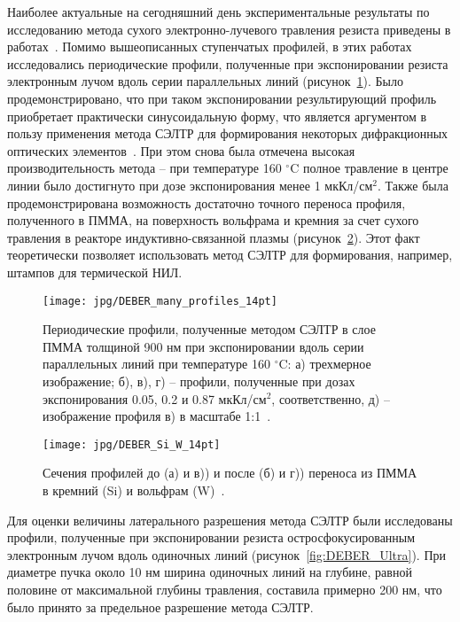 Наиболее актуальные на сегодняшний день экспериментальные результаты по исследованию метода сухого электронно-лучевого травления резиста приведены в работах~\cite{Bruk_2015_co, Bruk_2016_mee}. Помимо вышеописанных ступенчатых профилей, в этих работах исследовались периодические профили, полученные при экспонировании резиста электронным лучом вдоль серии параллельных линий (рисунок~\ref{fig:DEBER_many_profiles}). Было продемонстрировано, что при таком экспонировании результирующий профиль приобретает практически синусоидальную форму, что является аргументом в пользу применения метода СЭЛТР для формирования некоторых дифракционных оптических элементов~\cite{Mitreska_sin_gratings}. При этом снова была отмечена высокая производительность метода -- при температуре 160 $^\circ$C полное травление в центре линии было достигнуто при дозе экспонирования менее 1 мкКл/см$^2$. Также была продемонстрирована возможность достаточно точного переноса профиля, полученного в ПММА, на поверхность вольфрама и кремния за счет сухого травления в реакторе индуктивно-связанной плазмы (рисунок~\ref{fig:DEBER_Si_W}). Этот факт теоретически позволяет использовать метод СЭЛТР для формирования, например, штампов для термической НИЛ.

\begin{figure}
	\centering
	\texttt{[image: jpg/DEBER\_many\_profiles\_14pt]}
	\caption{Периодические профили, полученные методом СЭЛТР в слое ПММА толщиной 900 нм при экспонировании вдоль серии параллельных линий при температуре 160 $^\circ$C: а) трехмерное изображение; б), в), г) -- профили, полученные при дозах экспонирования 0.05, 0.2 и 0.87 мкКл/см$^2$, соответственно, д) -- изображение профиля в) в масштабе 1:1~\cite{Bruk_2016_mee}.}
	\label{fig:DEBER_many_profiles}
\end{figure}

\begin{figure}[t]
	\centering
	\texttt{[image: jpg/DEBER\_Si\_W\_14pt]}
	\caption{Сечения профилей до (а) и в)) и после (б) и г)) переноса из ПММА в кремний (Si) и вольфрам (W)~\cite{Bruk_2016_mee}.}
	\label{fig:DEBER_Si_W}
\end{figure}

Для оценки величины латерального разрешения метода СЭЛТР были исследованы профили, полученные при экспонировании резиста остросфокусированным электронным лучом вдоль одиночных линий (рисунок~\ref{fig:DEBER_Ultra}). При диаметре пучка около 10 нм ширина одиночных линий на глубине, равной половине от максимальной глубины травления, составила примерно 200 нм, что было принято за предельное разрешение метода СЭЛТР.

